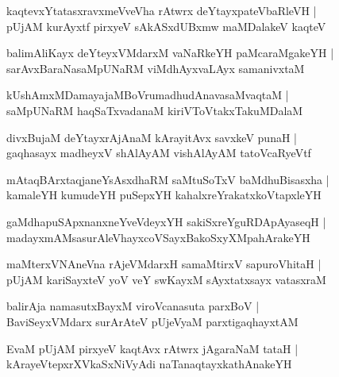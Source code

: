 \documentclass[twoside,12pt,openright]{book}
\newcounter{shloka}[chapter]
\begin{document}
\begin{shloka}%
kaqtevxYtatasxravxmeVveVha rAtwrx deYtayxpateVbaRleVH |\\
pUjAM kurAyxtf pirxyeV sAkASxdUBxmw maMDalakeV kaqteV 
\end{shloka}

\begin{shloka}%
balimAliKayx deYteyxVMdarxM vaNaRkeYH paMcaraMgakeYH |\\
sarAvxBaraNasaMpUNaRM viMdhAyxvaLAyx samanivxtaM 
\end{shloka}

\begin{shloka}%
kUshAmxMDamayajaMBoVrumadhudAnavasaMvaqtaM |\\
saMpUNaRM haqSaTxvadanaM kiriVToVtakxTakuMDalaM 
\end{shloka}

\begin{shloka}%
divxBujaM deYtayxrAjAnaM kArayitAvx savxkeV punaH |\\
gaqhasayx madheyxV shAlAyAM vishAlAyAM tatoVcaRyeVtf 
\end{shloka}

\begin{shloka}%
mAtaqBArxtaqjaneYsAsxdhaRM saMtuSoTxV baMdhuBisasxha |\\
kamaleYH kumudeYH puSepxYH kahalxreYrakatxkoVtapxleYH
\end{shloka}

\begin{shloka}%
gaMdhapuSApxnanxneYveVdeyxYH sakiSxreYguRDApAyaseqH |\\
madayxmAMsasurAleVhayxcoVSayxBakoSxyXMpahArakeYH
\end{shloka}

\begin{shloka}%
maMterxVNAneVna rAjeVMdarxH samaMtirxV sapuroVhitaH |\\
pUjAM kariSayxteV yoV veY swKayxM sAyxtatxsayx vatasxraM 
\end{shloka}

\begin{shloka}%
balirAja namasutxBayxM viroVcanasuta parxBoV |\\
BaviSeyxVMdarx surArAteV pUjeVyaM parxtigaqhayxtAM 
\end{shloka}

\begin{shloka}%
EvaM pUjAM pirxyeV kaqtAvx rAtwrx jAgaraNaM tataH |\\
kArayeVtepxrXVkaSxNiVyAdi naTanaqtayxkathAnakeYH 
\end{shloka}
\end{document}
